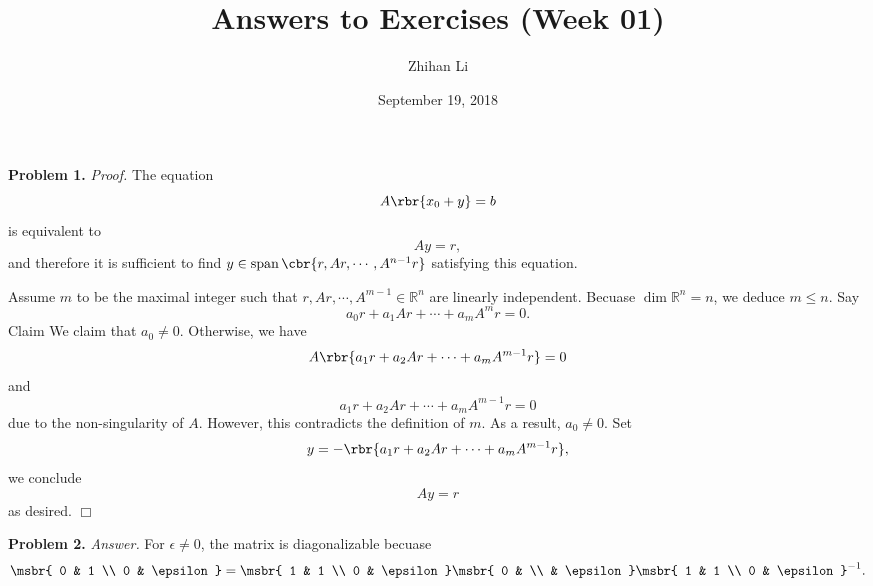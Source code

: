 \documentclass[english, nochinese]{pnote}
\title{Answers to Exercises (Week 01)}
\author{Zhihan Li}
\date{September 19, 2018}
\begin{document}
\maketitle

\textbf{Problem 1.} \textit{Proof.} The equation
\begin{equation}
A \rbr{ x_0 + y } = b
\end{equation}
is equivalent to
\begin{equation}
A y = r,
\end{equation}
and therefore it is sufficient to find $ y \in \mathop{\text{span}} \cbr{ r, A r, \cdots, A^{ n - 1 } r } $ satisfying this equation.

Assume $m$ to be the maximal integer such that $ r, A r, \cdots, A^{ m - 1 } \in \mathbb{R}^n $ are linearly independent. Becuase $ \dim \mathbb{R}^n = n $, we deduce $ m \le n $. Say
\begin{equation}
a_0 r + a_1 A r + \cdots + a_m A^m r = 0.
\end{equation}Claim
We claim that $ a_0 \neq 0 $. Otherwise, we have
\begin{equation}
A \rbr{ a_1 r + a_2 A r + \cdots + a_m A^{ m - 1 } r } = 0
\end{equation}
and
\begin{equation}
a_1 r + a_2 A r + \cdots + a_m A^{ m - 1 } r = 0
\end{equation}
due to the non-singularity of $A$. However, this contradicts the definition of $m$. As a result, $ a_0 \neq 0 $. Set
\begin{equation}
y = - \rbr{ a_1 r + a_2 A r + \cdots + a_m A^{ m - 1 } r },
\end{equation}
we conclude
\begin{equation}
A y = r
\end{equation}
as desired.
\hfill$\Box$

\textbf{Problem 2.} \textit{Answer.} For $ \epsilon \neq 0 $, the matrix is diagonalizable becuase
\begin{equation}
\msbr{ 0 & 1 \\ 0 & \epsilon } = \msbr{ 1 & 1 \\ 0 & \epsilon } \msbr{ 0 & \\ & \epsilon } \msbr{ 1 & 1 \\ 0 & \epsilon }^{-1}.
\end{equation}
\end{document}
